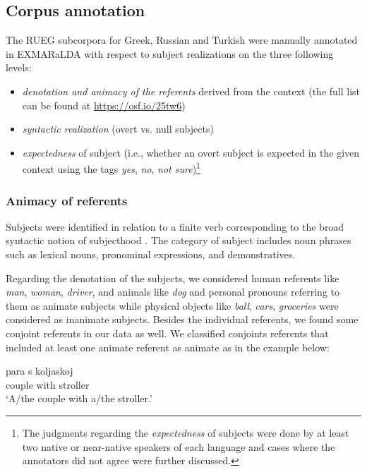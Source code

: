\documentclass[output=paper,colorlinks,citecolor=brown]{langscibook}
\begin{document}
\subsection{Corpus annotation} \label{sec:oezsoy:Corpus}
The RUEG subcorpora for Greek, Russian and Turkish were manually annotated in EXMARaLDA \parencite{Exmaralda} with respect to subject realizations on the three following levels: 

\begin{itemize}
    \item \textit{denotation and animacy of the referents} derived from the context (the full list can be found at \url{https://osf.io/25tw6})
    \item \textit{syntactic realization} (overt vs. null subjects)
    \item \textit{expectedness} of subject (i.e., whether an overt subject is expected in the given context using the tags \textit{yes}, \textit{no}, \textit{not sure})\footnote{The judgments regarding the \textit{expectedness} of subjects were done by at least two native or near-native speakers of each language and cases where the annotators did not agree were further discussed.}
\end{itemize}

\subsubsection{Animacy of referents}

Subjects were identified in relation to a finite verb corresponding to the broad syntactic notion of subjecthood \parencite{mccloskey1997subjecthood}. The category of subject includes noun phrases such as lexical nouns, pronominal expressions, and demonstratives.

Regarding the denotation of the subjects, we considered human referents like \textit{man}, \textit{woman}, \textit{driver}, and animals like \textit{dog} and personal pronouns referring to them as animate subjects while physical objects like \textit{ball}, \textit{cars}, \textit{groceries} were considered as inanimate subjects.
Besides the individual referents, we found some conjoint referents in our data as well. 
We classified conjoints referents that included at least one animate referent as animate \parencite{adamson2021interpretability} as in the example below:

\ea 
\gll para s koljaskoj\\ 
	couple with stroller\\
\glt `A/the couple with a/the stroller.'
\z
{}
\end{document}
